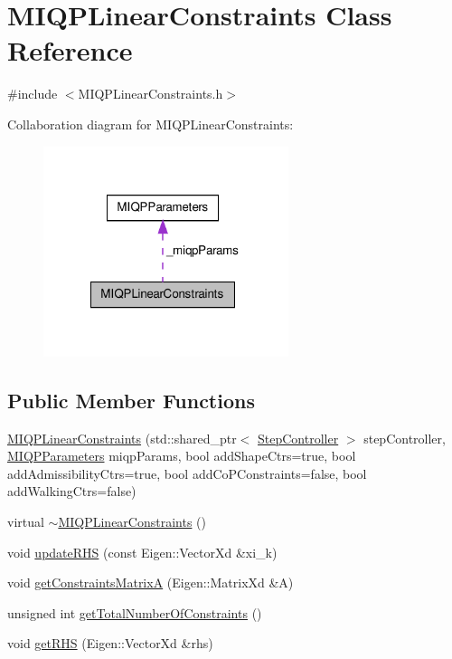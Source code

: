 \hypertarget{classMIQPLinearConstraints}{\section{\-M\-I\-Q\-P\-Linear\-Constraints \-Class \-Reference}
\label{classMIQPLinearConstraints}
}


{\ttfamily \#include $<$\-M\-I\-Q\-P\-Linear\-Constraints.\-h$>$}



\-Collaboration diagram for \-M\-I\-Q\-P\-Linear\-Constraints\-:\nopagebreak
\begin{figure}[H]
\begin{center}
\leavevmode
\includegraphics[width=203pt]{classMIQPLinearConstraints__coll__graph}
\end{center}
\end{figure}
\subsection*{\-Public \-Member \-Functions}
\begin{DoxyCompactItemize}
\item 
\hyperlink{classMIQPLinearConstraints_aaa55e8fc7fac6499f60c40e13b0d6605}{\-M\-I\-Q\-P\-Linear\-Constraints} (std\-::shared\-\_\-ptr$<$ \hyperlink{classStepController}{\-Step\-Controller} $>$ step\-Controller, \hyperlink{structMIQPParameters}{\-M\-I\-Q\-P\-Parameters} miqp\-Params, bool add\-Shape\-Ctrs=true, bool add\-Admissibility\-Ctrs=true, bool add\-Co\-P\-Constraints=false, bool add\-Walking\-Ctrs=false)
\item 
virtual \hyperlink{classMIQPLinearConstraints_a1539d3c8eb2af42daa9bb17dd0f44bd2}{$\sim$\-M\-I\-Q\-P\-Linear\-Constraints} ()
\item 
void \hyperlink{classMIQPLinearConstraints_a27ae3bdf1d4b4bd1e5279607e4b96f1a}{update\-R\-H\-S} (const \-Eigen\-::\-Vector\-Xd \&xi\-\_\-k)
\item 
void \hyperlink{classMIQPLinearConstraints_ab556e990dcc0b1fcd152f41a8c00e1f6}{get\-Constraints\-Matrix\-A} (\-Eigen\-::\-Matrix\-Xd \&\-A)
\item 
unsigned int \hyperlink{classMIQPLinearConstraints_a656681ab464709b025e4522df3458fa1}{get\-Total\-Number\-Of\-Constraints} ()
\item 
void \hyperlink{classMIQPLinearConstraints_abf2bd3e8f0dfa5b919efa1b90b56232a}{get\-R\-H\-S} (\-Eigen\-::\-Vector\-Xd \&rhs)
\end{DoxyCompactItemize}
